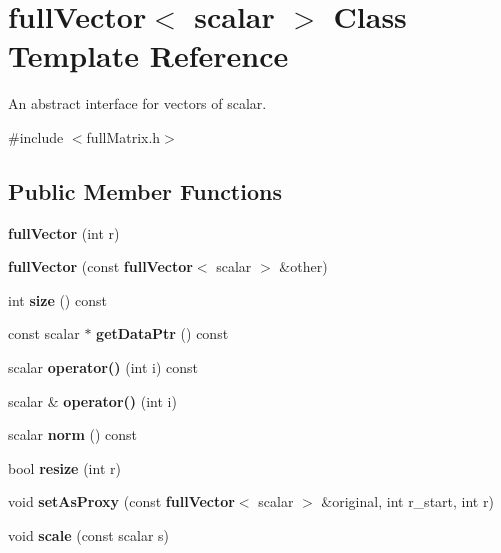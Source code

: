 \section{full\-Vector$<$ scalar $>$ Class Template Reference}
\label{classfullVector}


An abstract interface for vectors of scalar.  




{\ttfamily \#include $<$full\-Matrix.\-h$>$}

\subsection*{Public Member Functions}
\begin{DoxyCompactItemize}
\item 
{\bfseries full\-Vector} (int r)\label{classfullVector_a3cb67bf3c868558653c0bbbd0a216adf}

\item 
{\bfseries full\-Vector} (const {\bf full\-Vector}$<$ scalar $>$ \&other)\label{classfullVector_ae92b77974c90b3fce78dc3c243f968cc}

\item 
int {\bfseries size} () const \label{classfullVector_a7e35504a99422ea6e0719af9c0b287ec}

\item 
const scalar $\ast$ {\bfseries get\-Data\-Ptr} () const \label{classfullVector_a8dedfa4f3a237b79b51de33d6b1254ea}

\item 
scalar {\bfseries operator()} (int i) const \label{classfullVector_ad23d7c556d8808c19bc29ee2f409940f}

\item 
scalar \& {\bfseries operator()} (int i)\label{classfullVector_a9fddeccbbda0334d5c595356193af6ad}

\item 
scalar {\bfseries norm} () const \label{classfullVector_ac8cc99c9e4958d57eb0737734a72a11e}

\item 
bool {\bfseries resize} (int r)\label{classfullVector_a3c8386df4c6384d79721869ec5bc0423}

\item 
void {\bfseries set\-As\-Proxy} (const {\bf full\-Vector}$<$ scalar $>$ \&original, int r\-\_\-start, int r)\label{classfullVector_ad6402df3f4a766c7cb198a05997cdf9d}

\item 
void {\bfseries scale} (const scalar s)\label{classfullVector_af5e640f8fd6854646ed13063fadbb449}


\end{DoxyCompactItemize}
